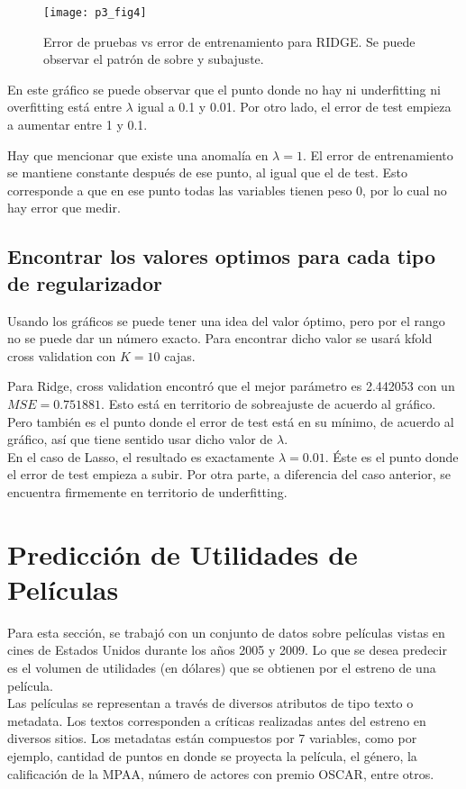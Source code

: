 \documentclass[letter, 10pt]{article}
\begin{document}
\begin{figure}[H]
  \centering
  \texttt{[image: p3\_fig4]} 
  \caption{Error de pruebas vs error de entrenamiento para RIDGE. Se puede
    observar el patrón de sobre y subajuste.}
  \label{fig:p3_g2}
\end{figure}

En este gráfico se puede observar que el punto donde no hay ni underfitting ni
overfitting está entre $\lambda$ igual a 0.1 y 0.01. Por otro lado, el error de
test empieza a aumentar entre 1 y 0.1.

Hay que mencionar que existe una anomalía en $\lambda = 1$. El error de
entrenamiento se mantiene constante después de ese punto, al igual que el de
test. Esto corresponde a que en ese punto todas las variables tienen peso 0, por
lo cual no hay error que medir.
\subsection{Encontrar los valores optimos para cada tipo de regularizador}
Usando los gráficos se puede tener una idea del valor óptimo, pero por el rango
no se puede dar un número exacto. Para encontrar dicho valor se usará kfold
cross validation con $K = 10$ cajas.

Para Ridge, cross validation encontró que el mejor parámetro es 2.442053 con un
$MSE = 0.751881$. Esto está en territorio de sobreajuste de acuerdo al gráfico.
Pero también es el punto donde el error de test está en su mínimo, de acuerdo al
gráfico, así que tiene sentido usar dicho valor de $\lambda$.\\

En el caso de Lasso, el resultado es exactamente $\lambda = 0.01$. Éste es el punto donde el
error de test empieza a subir. Por otra parte, a diferencia del caso anterior,
se encuentra firmemente en territorio de underfitting.
\section{Predicción de Utilidades de Películas}

Para esta sección, se trabajó con un conjunto de datos sobre películas vistas en cines de Estados Unidos durante los años 2005 y 2009. Lo que se desea predecir es el volumen de utilidades (en dólares) que se obtienen por el estreno de una película.\\

Las películas se representan a través de diversos atributos de tipo texto o metadata. Los textos corresponden a críticas realizadas antes del estreno en diversos sitios. Los metadatas están compuestos por 7 variables, como por ejemplo, cantidad de puntos en donde se proyecta la película, el género, la calificación de la MPAA, número de actores con premio OSCAR, entre otros.\\
\end{document}
